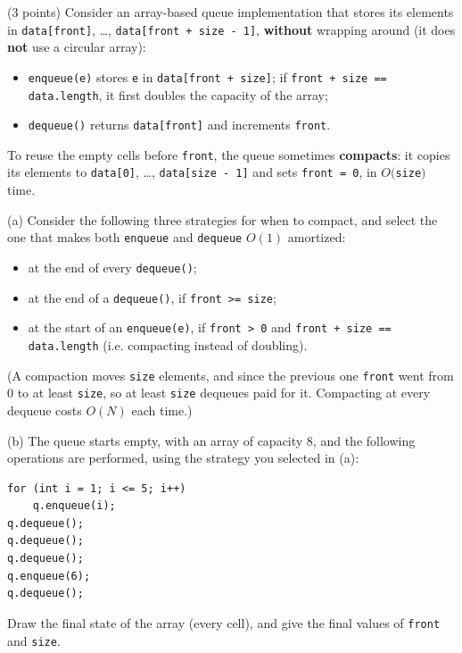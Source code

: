 \begin{question}
(3 points) Consider an array-based queue implementation that stores its elements in \lstinline|data[front]|, \ldots, \lstinline|data[front + size - 1]|, \textbf{without} wrapping around (it does \textbf{not} use a circular array):
\begin{itemize}[leftmargin=2em,itemsep=1pt,topsep=2pt]
\item \lstinline|enqueue(e)| stores \lstinline|e| in \lstinline|data[front + size]|; if \lstinline|front + size == data.length|, it first doubles the capacity of the array;
\item \lstinline|dequeue()| returns \lstinline|data[front]| and increments \lstinline|front|.
\end{itemize}
To reuse the empty cells before \lstinline|front|, the queue sometimes \textbf{compacts}: it copies its elements to \lstinline|data[0]|, \ldots, \lstinline|data[size - 1]| and sets \lstinline|front = 0|, in $O($\lstinline|size|$)$ time.

(a) Consider the following three strategies for when to compact, and select the one that makes both \lstinline|enqueue| and \lstinline|dequeue| $O(1)$ amortized:
\begin{itemize}[leftmargin=2em,itemsep=1pt,topsep=2pt]
\item[\cb{0}] at the end of every \lstinline|dequeue()|;
\item[\cb{1}] at the end of a \lstinline|dequeue()|, if \lstinline|front >= size|;
\item[\cb{0}] at the start of an \lstinline|enqueue(e)|, if \lstinline|front > 0| and \lstinline|front + size == data.length| (i.e. compacting instead of doubling).
\end{itemize}

\ifanswers (A compaction moves \lstinline|size| elements, and since the previous one \lstinline|front| went from 0 to at least \lstinline|size|, so at least \lstinline|size| dequeues paid for it. Compacting at every dequeue costs $O(N)$ each time.)\fi

\bigskip
(b) The queue starts empty, with an array of capacity 8, and the following operations are performed, using the strategy you selected in (a):

\begin{minipage}[t]{0.35\linewidth}
\vspace{-\baselineskip}
\begin{lstlisting}
for (int i = 1; i <= 5; i++)
    q.enqueue(i);
q.dequeue();
q.dequeue();
q.dequeue();
q.enqueue(6);
q.dequeue();
\end{lstlisting}
\end{minipage}\hfill
\begin{minipage}[t]{0.6\linewidth}
Draw the final state of the array (every cell), and give the final values of \lstinline|front| and \lstinline|size|.


\end{minipage}
\end{question}
